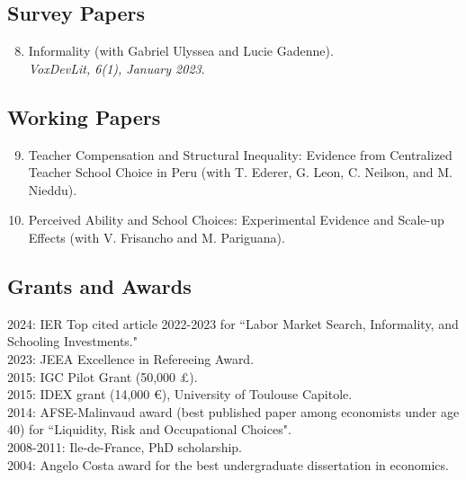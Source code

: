 \documentclass[12pt,english]{article}
\begin{document}
\subsection*{Survey Papers}
\begin{enumerate}
\setcounter{enumi}{7}
\item Informality (with Gabriel Ulyssea and Lucie Gadenne). \\
\textit{VoxDevLit, 6(1), January 2023}.
\end{enumerate}

\subsection*{Working Papers}
\begin{enumerate}
\setcounter{enumi}{8}


\item Teacher Compensation and Structural Inequality: Evidence from Centralized Teacher School Choice in Peru (with T. Ederer, G. Leon, C. Neilson, and M. Nieddu).
\item Perceived Ability and School Choices: Experimental Evidence and Scale-up Effects (with V. Frisancho and M. Pariguana).  


\end{enumerate}

\subsection*{Grants and Awards}
2024: IER Top cited article 2022-2023 for ``Labor Market Search, Informality, and Schooling Investments."\vspace{0.2cm} \\
2023: JEEA Excellence in Refereeing Award.\vspace{0.2cm} \\
2015: IGC Pilot Grant (50,000 \pounds). \vspace{0.2cm} \\
2015: IDEX grant (14,000 \euro), University of Toulouse Capitole. \vspace{0.2cm} \\
2014: AFSE-Malinvaud award (best published paper among economists under age 40) for ``Liquidity, Risk and Occupational Choices". \vspace{0.2cm}\\
2008-2011: Ile-de-France, PhD scholarship. \vspace{0.2cm}\\
2004: Angelo Costa award for the best undergraduate dissertation in economics. 
\end{document}
